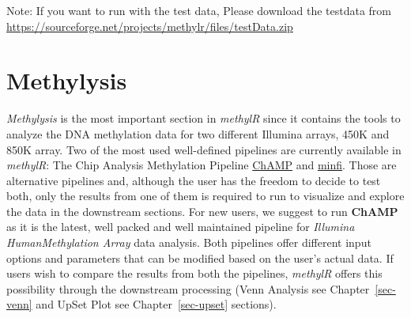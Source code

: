 \documentclass[
  a4paper,
  oneside,
  open=any]{scrreport}
\begin{document}
\begin{tcolorbox}[enhanced jigsaw, bottomrule=.15mm, left=2mm, coltitle=black, breakable, colback=white, arc=.35mm, rightrule=.15mm, opacitybacktitle=0.6, toptitle=1mm, leftrule=.75mm, toprule=.15mm, bottomtitle=1mm, opacityback=0, colbacktitle=quarto-callout-note-color!10!white, titlerule=0mm, colframe=quarto-callout-note-color-frame, title=\textcolor{quarto-callout-note-color}{\faInfo}\hspace{0.5em}{Note}]

Note: If you want to run with the test data, Please download the
testdata from
\url{https://sourceforge.net/projects/methylr/files/testData.zip}

\end{tcolorbox}

\hypertarget{sec-methylysis}{%
\chapter{Methylysis}\label{sec-methylysis}}

\emph{Methylysis} is the most important section in \emph{methylR} since
it contains the tools to analyze the DNA methylation data for two
different Illumina arrays, 450K and 850K array. Two of the most used
well-defined pipelines are currently available in \emph{methylR}: The
Chip Analysis Methylation Pipeline
\href{https://bioconductor.org/packages/release/bioc/vignettes/ChAMP/inst/doc/ChAMP.html}{ChAMP}
and
\href{https://bioconductor.org/packages/release/bioc/vignettes/minfi/inst/doc/minfi.html}{minfi}.
Those are alternative pipelines and, although the user has the freedom
to decide to test both, only the results from one of them is required to
run to visualize and explore the data in the downstream sections. For
new users, we suggest to run \textbf{ChAMP} as it is the latest, well
packed and well maintained pipeline for \emph{Illumina HumanMethylation
Array} data analysis. Both pipelines offer different input options and
parameters that can be modified based on the user's actual data. If
users wish to compare the results from both the pipelines,
\emph{methylR} offers this possibility through the downstream processing
(Venn Analysis see Chapter~\ref{sec-venn} and UpSet Plot see
Chapter~\ref{sec-upset} sections).
\end{document}
